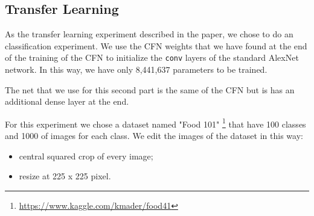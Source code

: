 \subsection{Transfer Learning}
As the transfer learning experiment described in the paper, we chose to do an classification experiment. We use the CFN weights that we have found at the end of the training of the CFN to initialize the \texttt{conv} layers of the standard AlexNet network. In this way, we have only 8,441,637 parameters to be trained.

The net that we use for this second part is the same of the CFN but is has an additional dense layer at the end.

For this experiment we chose a dataset named "Food 101" \footnote{\url{https://www.kaggle.com/kmader/food41}} that have 100 classes and 1000 of images for each class. We edit the images of the dataset in this way:

\begin{itemize}
	\item central squared crop of every image;
	\item resize at 225 x 225 pixel.
\end{itemize}